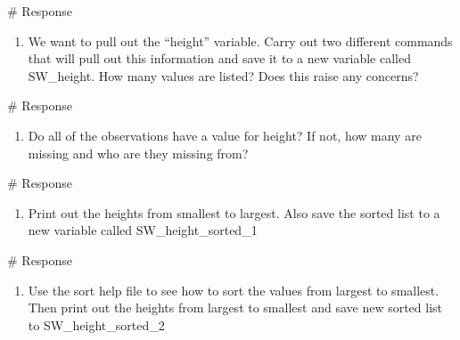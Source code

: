 \documentclass[
  letterpaper,
  DIV=11,
  numbers=noendperiod]{scrreprt}
\newenvironment{Shaded}{\begin{snugshade}}{\end{snugshade}}
\newcommand{\CommentTok}[1]{\textcolor[rgb]{0.37,0.37,0.37}{#1}}
\providecommand{\tightlist}{%
  \setlength{\itemsep}{0pt}\setlength{\parskip}{0pt}}\usepackage{longtable,booktabs,array}
\begin{document}
\begin{Shaded}
\begin{Highlighting}[]
\CommentTok{\# Response}
\end{Highlighting}
\end{Shaded}

\begin{enumerate}
\def\labelenumi{\arabic{enumi}.}
\setcounter{enumi}{4}
\tightlist
\item
  We want to pull out the ``height'' variable. Carry out two different
  commands that will pull out this information and save it to a new
  variable called SW\_height. How many values are listed? Does this
  raise any concerns?
\end{enumerate}

\begin{Shaded}
\begin{Highlighting}[]
\CommentTok{\# Response}
\end{Highlighting}
\end{Shaded}

\begin{enumerate}
\def\labelenumi{\arabic{enumi}.}
\setcounter{enumi}{5}
\tightlist
\item
  Do all of the observations have a value for height? If not, how many
  are missing and who are they missing from?
\end{enumerate}

\begin{Shaded}
\begin{Highlighting}[]
\CommentTok{\# Response}
\end{Highlighting}
\end{Shaded}

\begin{enumerate}
\def\labelenumi{\arabic{enumi}.}
\setcounter{enumi}{6}
\tightlist
\item
  Print out the heights from smallest to largest. Also save the sorted
  list to a new variable called SW\_height\_sorted\_1
\end{enumerate}

\begin{Shaded}
\begin{Highlighting}[]
\CommentTok{\# Response}
\end{Highlighting}
\end{Shaded}

\begin{enumerate}
\def\labelenumi{\arabic{enumi}.}
\setcounter{enumi}{7}
\tightlist
\item
  Use the sort help file to see how to sort the values from largest to
  smallest. Then print out the heights from largest to smallest and save
  new sorted list to SW\_height\_sorted\_2
\end{enumerate}
\end{document}
